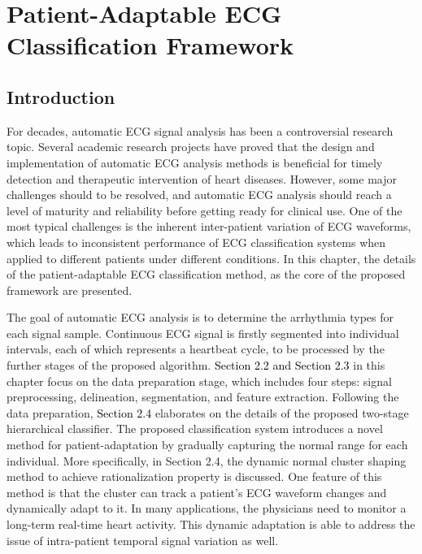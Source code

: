 \chapter{Patient-Adaptable ECG Classification Framework}

\section{Introduction}
For decades, automatic ECG signal analysis has been a controversial research topic. Several academic research projects have proved that the design and implementation of automatic ECG analysis methods is beneficial for timely detection and therapeutic intervention of heart diseases. However, some major challenges should to be resolved, and automatic ECG analysis should reach a level of maturity and reliability before getting ready for clinical use. One of the most typical challenges is the inherent inter-patient variation of ECG waveforms, which leads to inconsistent performance of ECG classification systems when applied to different patients under different conditions. In this chapter, the details of the patient-adaptable ECG classification method, as the core of the proposed framework are presented.

The goal of automatic ECG analysis is to determine the arrhythmia types for each signal sample. Continuous ECG signal is firstly segmented into individual intervals, each of which represents a heartbeat cycle, to be processed by the further stages of the proposed algorithm. \textcolor{black}{Section 2.2 and Section 2.3} in this chapter focus on the data preparation stage, which includes four steps: signal preprocessing, delineation, segmentation, and feature extraction. Following the data preparation, \textcolor{black}{Section 2.4} elaborates on the details of the proposed two-stage hierarchical classifier. The proposed classification system introduces a novel method for patient-adaptation by gradually capturing the normal range for each individual. More specifically, in Section 2.4, the dynamic normal cluster shaping method to achieve rationalization property is discussed. One feature of this method is that the cluster can track a patient's ECG waveform changes and dynamically adapt to it. In many applications, the physicians need to monitor a long-term real-time heart activity. This dynamic adaptation is able to address the issue of intra-patient temporal signal variation as well.


